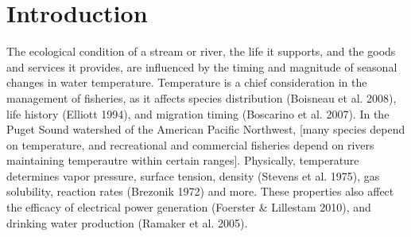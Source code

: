 \documentclass{article}
\begin{document}

\section*{Introduction}

The ecological condition of a stream or river, the life it supports, and the goods and services it provides, are influenced by the timing and magnitude of seasonal changes in water temperature. Temperature is a chief consideration in the management of fisheries, as it affects species distribution (Boisneau et al. 2008), life history (Elliott 1994), and migration timing (Boscarino et al. 2007). In the Puget Sound watershed of the American Pacific Northwest, [many species depend on temperature, and recreational and commercial fisheries depend on rivers maintaining temperautre within certain ranges]. Physically, temperature determines vapor pressure, surface tension, density (Stevens et al. 1975), gas solubility, reaction rates (Brezonik 1972) and more.  These properties also affect the efficacy of electrical power generation (Foerster & Lillestam 2010), and drinking water production (Ramaker et al. 2005).
\end{document}
